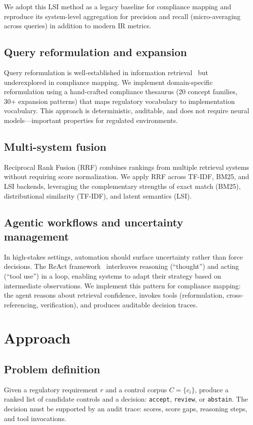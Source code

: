 \documentclass{sn-jnl}
\begin{document}
We adopt this LSI method as a legacy baseline for compliance mapping and reproduce its system-level aggregation for precision and recall (micro-averaging across queries) in addition to modern IR metrics.

\subsection{Query reformulation and expansion}
Query reformulation is well-established in information retrieval~\cite{BM25} but underexplored in compliance mapping.
We implement domain-specific reformulation using a hand-crafted compliance thesaurus (20 concept families, 30+ expansion patterns) that maps regulatory vocabulary to implementation vocabulary.
This approach is deterministic, auditable, and does not require neural models---important properties for regulated environments.

\subsection{Multi-system fusion}
Reciprocal Rank Fusion (RRF) combines rankings from multiple retrieval systems without requiring score normalization.
We apply RRF across TF-IDF, BM25, and LSI backends, leveraging the complementary strengths of exact match (BM25), distributional similarity (TF-IDF), and latent semantics (LSI).

\subsection{Agentic workflows and uncertainty management}
In high-stakes settings, automation should surface uncertainty rather than force decisions.
The ReAct framework~\cite{ReAct} interleaves reasoning (``thought'') and acting (``tool use'') in a loop, enabling systems to adapt their strategy based on intermediate observations.
We implement this pattern for compliance mapping: the agent reasons about retrieval confidence, invokes tools (reformulation, cross-referencing, verification), and produces auditable decision traces.

\section{Approach}

\subsection{Problem definition}
Given a regulatory requirement $r$ and a control corpus $C=\{c_i\}$, produce a ranked list of candidate controls and a decision:
\texttt{accept}, \texttt{review}, or \texttt{abstain}.
The decision must be supported by an audit trace: scores, score gaps, reasoning steps, and tool invocations.
\end{document}
